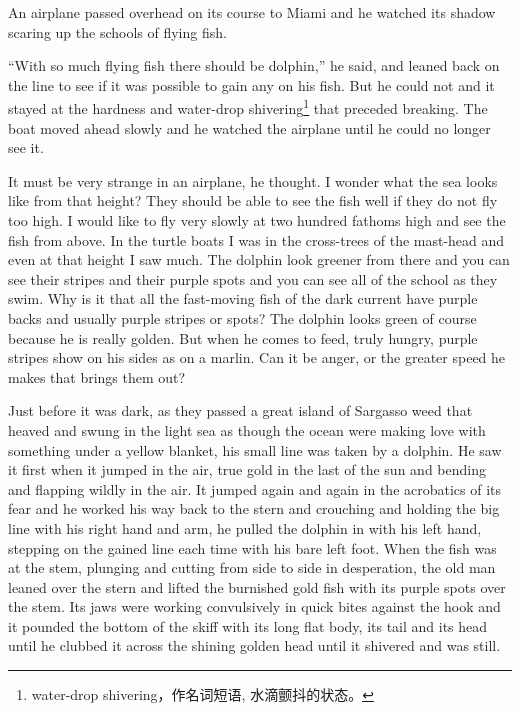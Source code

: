 \documentclass[fontset=ubuntu]{ctexrep}
\newlength{\drop}%
\begin{document}
An airplane passed overhead on its course to Miami and he watched its shadow
scaring up the schools of flying fish.

``With so much flying fish there should be dolphin,'' he said, and leaned
back on the line to see if it was possible to gain any on his fish. But he
could not and it stayed at the \gls{hardness} and water-drop
shivering\footnote{water-drop shivering，作名词短语, 水滴颤抖的状态。} that
\gls{preceded} breaking. The boat moved ahead slowly and he watched the
airplane until he could no longer see it.

It must be very strange in an airplane, he thought. I wonder what the sea
looks like from that height? They should be able to see the fish well if
they do not fly too high. I would like to fly very slowly at two hundred
fathoms high and see the fish from above. In the turtle boats I was in the
cross-trees of the mast-head and even at that height I saw much. The dolphin
look greener from there and you can see their stripes and their purple \glspl{spot}
and you can see all of the school as they swim. Why is it that all the
fast-moving fish of the dark current have purple backs and usually purple
stripes or spots? The dolphin looks green of course because he is really
golden. But when he comes to feed, truly hungry, purple stripes show on his
sides as on a marlin. Can it be \gls{anger}, or the greater speed he makes
that brings them out?

Just before it was dark, as they passed a great island of Sargasso weed that
\gls{heaved} and swung in the light sea as though the ocean were making love
with something under a yellow blanket, his small line was taken by a
dolphin. He saw it first when it jumped in the air, true gold in the last of
the sun and \gls{bending} and \gls{flapping} wildly in the air. It jumped
again and again in the \gls{acrobatics} of its \gls{fear} and he worked his
way back to the stern and \gls{crouching} and holding the big line with his
right hand and arm, he pulled the dolphin in with his left hand, stepping on
the gained line each time with his bare left foot. When the fish was at the
\gls{stem}, \gls{plunging} and cutting from side to side in
\gls{desperation}, the old man leaned over the stern and lifted the
\gls{burnished} gold fish with its purple spots over the stem. Its
\glspl{jaw} were working \gls{convulsively} in quick bites against the hook
and it pounded the bottom of the skiff with its long flat body, its tail and
its head until he \gls{clubbed} it across the shining golden head until it
shivered and was still.
\end{document}
